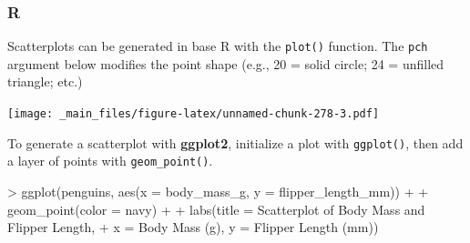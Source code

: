 \documentclass[
]{book}
\newenvironment{Shaded}{\begin{snugshade}}{\end{snugshade}}
\newcommand{\AttributeTok}[1]{\textcolor[rgb]{0.77,0.63,0.00}{#1}}
\newcommand{\DecValTok}[1]{\textcolor[rgb]{0.00,0.00,0.81}{#1}}
\newcommand{\FunctionTok}[1]{\textcolor[rgb]{0.00,0.00,0.00}{#1}}
\newcommand{\NormalTok}[1]{#1}
\newcommand{\SpecialCharTok}[1]{\textcolor[rgb]{0.00,0.00,0.00}{#1}}
\newcommand{\StringTok}[1]{\textcolor[rgb]{0.31,0.60,0.02}{#1}}
\begin{document}
\hypertarget{r-43}{%
\subsubsection*{R}\label{r-43}}

Scatterplots can be generated in base R with the \texttt{plot()} function. The \texttt{pch} argument below modifies the point shape (e.g., 20 = solid circle; 24 = unfilled triangle; etc.)

\begin{Shaded}
\end{Shaded}

\texttt{[image: \_main\_files/figure-latex/unnamed-chunk-278-3.pdf]}

To generate a scatterplot with \textbf{ggplot2}, initialize a plot with \texttt{ggplot()}, then add a layer of points with \texttt{geom\_point()}.

\begin{Shaded}
\begin{Highlighting}[]
\SpecialCharTok{\textgreater{}} \FunctionTok{ggplot}\NormalTok{(penguins, }\FunctionTok{aes}\NormalTok{(}\AttributeTok{x =}\NormalTok{ body\_mass\_g, }\AttributeTok{y =}\NormalTok{ flipper\_length\_mm)) }\SpecialCharTok{+}
\SpecialCharTok{+}   \FunctionTok{geom\_point}\NormalTok{(}\AttributeTok{color =} \StringTok{\textquotesingle{}navy\textquotesingle{}}\NormalTok{) }\SpecialCharTok{+}
\SpecialCharTok{+}   \FunctionTok{labs}\NormalTok{(}\AttributeTok{title =} \StringTok{\textquotesingle{}Scatterplot of Body Mass and Flipper Length\textquotesingle{}}\NormalTok{, }
\SpecialCharTok{+}        \AttributeTok{x =} \StringTok{\textquotesingle{}Body Mass (g)\textquotesingle{}}\NormalTok{, }\AttributeTok{y =} \StringTok{\textquotesingle{}Flipper Length (mm)\textquotesingle{}}\NormalTok{)}
\end{Highlighting}
\end{Shaded}
\end{document}
